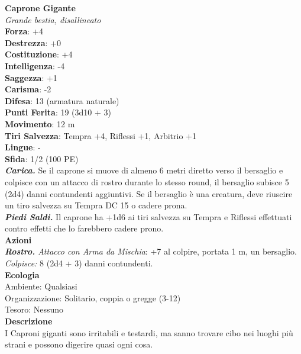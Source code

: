 \begin{multicols}{2}
\medskip\textbf{Caprone Gigante}\\
\emph{Grande bestia, disallineato}\\
\textbf{Forza}: +4\\
\textbf{Destrezza}: +0\\
\textbf{Costituzione}: +4\\
\textbf{Intelligenza}: -4\\
\textbf{Saggezza}: +1\\
\textbf{Carisma}: -2\\
\textbf{Difesa}: 13 (armatura naturale)\\
\textbf{Punti Ferita}: 19 (3d10 + 3)\\
\textbf{Movimento}: 12 m\\
\textbf{Tiri Salvezza}: Tempra +4, Riflessi +1, Arbitrio +1 \\
\textbf{Lingue}: -\\
\textbf{Sfida}: 1/2 (100 PE)\smallskip\\
\emph{\textbf{Carica.}} Se il caprone si muove di almeno 6 metri diretto verso il bersaglio e colpisce con un attacco di rostro durante lo stesso round, il bersaglio subisce 5 (2d4) danni contundenti aggiuntivi. Se il bersaglio è una creatura, deve riuscire un tiro salvezza su Tempra DC  15 o cadere prona.\\
\emph{\textbf{Piedi Saldi.}} Il caprone ha +1d6 ai tiri salvezza su Tempra e Riflessi effettuati contro effetti che lo farebbero cadere prono.\\
\smallskip\textbf{Azioni}\\
\emph{\textbf{Rostro.} Attacco con Arma da Mischia}: +7 al colpire, portata 1 m, un bersaglio.\\
\emph{Colpisce:} 8 (2d4 + 3) danni contundenti.\\
\textbf{Ecologia}\\
Ambiente: Qualsiasi\\
Organizzazione: Solitario, coppia o gregge (3-12)\\
Tesoro: Nessuno\\
\textbf{Descrizione}\\
I Caproni giganti sono irritabili e testardi, ma sanno trovare cibo nei luoghi più strani e possono digerire quasi ogni cosa. \\


\end{multicols}
